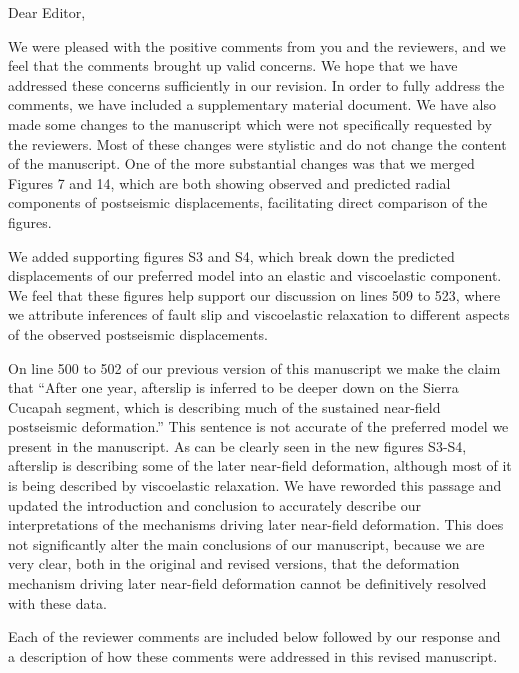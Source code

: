 \documentclass[10pt,a4paper]{letter}
\begin{document}
\signature{Trever T. Hines}

\begin{letter}{}
\opening{Dear Editor,}

We were pleased with the positive comments from you and the reviewers, and we feel that the comments brought up valid concerns. We hope that we have addressed these concerns sufficiently in our revision. In order to fully address the comments, we have included a supplementary material document.  We have also made some changes to the manuscript which were not specifically requested by the reviewers.  Most of these changes were stylistic and do not change the content of the manuscript.  One of the more substantial changes was that we merged Figures 7 and 14, which are both showing observed and predicted radial components of postseismic displacements, facilitating direct comparison of the figures. 

We added supporting figures S3 and S4, which break down the predicted displacements of our preferred model into an elastic and viscoelastic component.  We feel that these figures help support our discussion on lines 509 to 523, where we attribute inferences of fault slip and viscoelastic relaxation to different aspects of the observed postseismic displacements.  

On line 500 to 502 of our previous version of this manuscript we make the claim that “After one year, afterslip is inferred to be deeper down on the Sierra Cucapah segment, which is describing much of the sustained near-field postseismic deformation.”  This sentence is not accurate of the preferred model we present in the manuscript. As can be clearly seen in the new figures S3-S4, afterslip is describing some of the later near-field deformation, although most of it is being described by viscoelastic relaxation.  We have reworded this passage and updated the introduction and conclusion to accurately describe our interpretations of the mechanisms driving later near-field deformation.  This does not significantly alter the main conclusions of our manuscript, because we are very clear, both in the original and revised versions, that the deformation mechanism driving later near-field deformation cannot be definitively resolved with these data.        

Each of the reviewer comments are included below followed by our response and a description of how these comments were addressed in this revised manuscript.



\end{letter}
\end{document}
